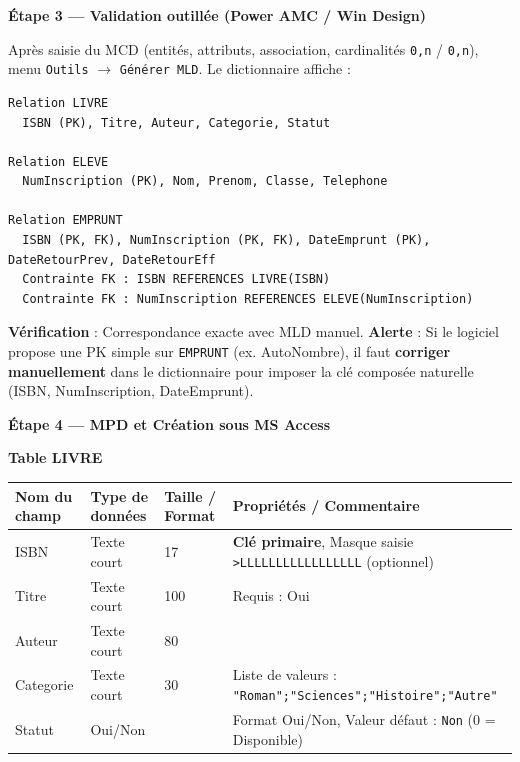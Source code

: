 \documentclass[11pt]{article}
\begin{document}
\begin{exoresolu}
\textbf{Étape 3 — Validation outillée (Power AMC / Win Design)}

\begin{exemplebox}
Après saisie du MCD (entités, attributs, association, cardinalités \texttt{0,n} / \texttt{0,n}), menu \texttt{Outils} $\rightarrow$ \texttt{Générer MLD}. Le dictionnaire affiche :
\begin{lstlisting}
Relation LIVRE
  ISBN (PK), Titre, Auteur, Categorie, Statut

Relation ELEVE
  NumInscription (PK), Nom, Prenom, Classe, Telephone

Relation EMPRUNT
  ISBN (PK, FK), NumInscription (PK, FK), DateEmprunt (PK), DateRetourPrev, DateRetourEff
  Contrainte FK : ISBN REFERENCES LIVRE(ISBN)
  Contrainte FK : NumInscription REFERENCES ELEVE(NumInscription)
\end{lstlisting}
\textbf{Vérification} : Correspondance exacte avec MLD manuel. \textbf{Alerte} : Si le logiciel propose une PK simple sur \texttt{EMPRUNT} (ex. AutoNombre), il faut \textbf{corriger manuellement} dans le dictionnaire pour imposer la clé composée naturelle (ISBN, NumInscription, DateEmprunt).
\end{exemplebox}

\textbf{Étape 4 — MPD et Création sous MS Access}

\begin{methode}
\textbf{Table LIVRE}
\begin{center}
\begin{tabularx}{\linewidth}{|l|l|l|X|}\hline
\textbf{Nom du champ} & \textbf{Type de données} & \textbf{Taille / Format} & \textbf{Propriétés / Commentaire} \\ \hline
ISBN & Texte court & 17 & \textbf{Clé primaire}, Masque saisie \texttt{>LLLLLLLLLLLLLLLLL} (optionnel) \\ \hline
Titre & Texte court & 100 & Requis : Oui \\ \hline
Auteur & Texte court & 80 &  \\ \hline
Categorie & Texte court & 30 & Liste de valeurs : \texttt{"Roman";"Sciences";"Histoire";"Autre"} \\ \hline
Statut & Oui/Non &  & Format Oui/Non, Valeur défaut : \texttt{Non} (0 = Disponible) \\ \hline
\end{tabularx}
\end{center}


\end{methode}
\end{exoresolu}
\end{document}
